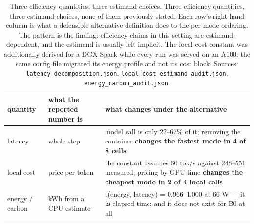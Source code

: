 \begin{table}[tp]
\centering
\caption{Three efficiency quantities, three estimand choices. Three efficiency quantities, three estimand choices, none of them previously stated. Each row's right-hand column is what a defensible alternative definition does to the per-mode ordering. The pattern is the finding: efficiency claims in this setting are estimand-dependent, and the estimand is usually left implicit. The local-cost constant was additionally derived for a DGX Spark while every run was served on an A100: the same config file migrated its energy profile and not its cost block. Sources: \texttt{latency\_decomposition.json}, \texttt{local\_cost\_estimand\_audit.json}, \texttt{energy\_carbon\_audit.json}.}
\label{tab:t12}
\footnotesize
\setlength{\tabcolsep}{3pt}
\begin{tabular}{@{}
  >{\raggedright\arraybackslash}p{}
  >{\raggedright\arraybackslash}p{}
  >{\raggedright\arraybackslash}p{}@{}}
\toprule
\begin{minipage}[b]{\linewidth}\raggedright
quantity
\end{minipage} & \begin{minipage}[b]{\linewidth}\raggedright
what the reported number is
\end{minipage} & \begin{minipage}[b]{\linewidth}\raggedright
what changes under the alternative
\end{minipage} \\
\midrule
latency & whole step & model call is only 22--67\% of it; removing the container \textbf{changes the fastest mode in 4 of 8 cells} \\
local cost & price per token & the constant assumes 60 tok/s against 248--551 measured; pricing by GPU-time \textbf{changes the cheapest mode in 2 of 4 local cells} \\
energy / carbon & kWh from a CPU estimate & r(energy, latency) = 0.966--1.000 at 66 W --- it \textbf{is} elapsed time; and it does not exist for B0 at all \\
\bottomrule
\end{tabular}
\end{table}
